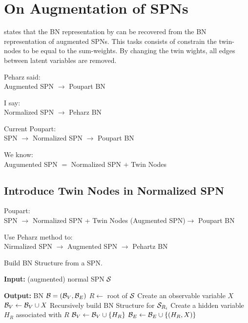 \clearpage
\section{On Augmentation of SPNs}
\label{sec:new}


\cite{peharz2015theoretical} states that the BN representation by \cite{zhao2015relationship} can be recovered from the BN representation of augmented SPNs.
This tasks consists of constrain the twin-nodes to be equal to the sum-weights.
By changing the twin wights, all edges between latent variables are removed.



Peharz said: \\
Augmented SPN $\rightarrow$ Poupart BN

I say: \\
Normalized SPN $\rightarrow$ Peharz BN

Current Poupart:\\
	SPN $\rightarrow$ Normalized SPN $\rightarrow$ Poupart BN

We know:\\
	Augumented SPN $=$ Normalized SPN $+$ Twin Nodes
	

\subsection{Introduce Twin Nodes in Normalized SPN}

Poupart:\\
	SPN $\rightarrow$ Normalized SPN + Twin Nodes (Augmented SPN)$\rightarrow$ Poupart BN
	
Use Peharz method to:\\
	Nirmalized SPN $\rightarrow$ Augmented SPN $\rightarrow$ Pehartz BN
	
\begin{algorithm}[!ht]
    \caption{Build BN Structure from a SPN.}
    \label{alg:poupart}
    \begin{algorithmic}[1]
        \item[\textbf{Input:} (augmented) normal SPN $\cal S$]
        \item[\textbf{Output:} BN ${\cal B} = ({\cal B}_V, {\cal B}_E)$]
		\State $R \leftarrow$ root of ${\cal S}$
			\State Create an observable variable $X$
			\State ${\cal B}_V \leftarrow {\cal B}_V \cup X$
		\Else
					\State Recursively build BN Structure for ${\cal S}_{R_i}$
				\EndIf
			\EndFor
				\State Create a hidden variable $H_R$ associated with $R$
				\State ${\cal B}_V \leftarrow {\cal B}_V \cup \{H_R\}$
					\State ${\cal B}_E \leftarrow {\cal B}_E \cup \{(H_R,X)\}$
				\EndFor
			\EndIf
		\EndIf		
    \end{algorithmic}
\end{algorithm}
	
